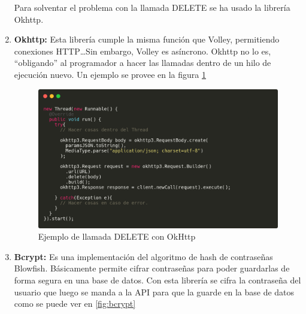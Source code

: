\begin{enumerate}
Para solventar el problema con la llamada DELETE se ha usado la librería Okhttp.

\item \textbf{Okhttp: } Esta librería cumple la misma función que Volley, permitiendo conexiones HTTP\dots Sin embargo, Volley es asíncrono. Okhttp no lo es, ``obligando'' al programador a hacer las llamadas dentro de un hilo de ejecución nuevo. Un ejemplo se provee en la figura \ref{fig:delete_okhttp}

% 
% 
% 

\begin{figure}[h!]
  \centering
  \includegraphics[width=0.8\linewidth]{figs/Desarrollo/Codigo/okhttp_ejemplo}
  \caption[Llamada DELETE con Okhttp]{Ejemplo de llamada DELETE con OkHttp}
  \label{fig:delete_okhttp}
\end{figure}

\item \textbf{Bcrypt: } Es una implementación del algoritmo de hash de contraseñas Blowfish. Básicamente permite cifrar contraseñas para poder guardarlas de forma segura en una base de datos. Con esta librería se cifra la contraseña del usuario que luego se manda a la API para que la guarde en la base de datos como se puede ver en \ref{fig:bcrypt}


\end{enumerate}
